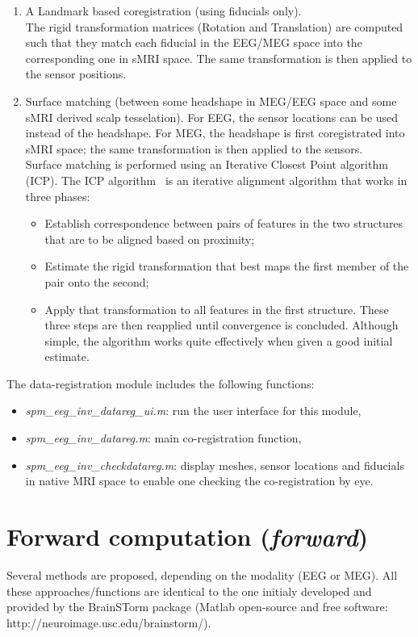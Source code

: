 \begin{enumerate}
	\item A Landmark based coregistration (using fiducials only).\\
	The rigid transformation matrices (Rotation and Translation) are computed such that they match each fiducial in the EEG/MEG space into the corresponding one in sMRI space. The same 					transformation is then applied to the sensor positions.
	\item Surface matching (between some headshape in MEG/EEG space and some sMRI derived scalp tesselation).
For EEG, the sensor locations can be used instead of the headshape. For MEG, the headshape is first coregistrated into sMRI space; the same transformation is then applied to the sensors.\\
Surface matching is performed using an Iterative Closest Point algorithm (ICP). The ICP algorithm~\cite{Besl_McKay} is an iterative alignment algorithm that works in three phases:
\begin{itemize}
	\item Establish correspondence between pairs of features in the two structures that are to be aligned based on proximity;
	\item Estimate the rigid transformation that best maps the first member of the pair onto the second;
	\item Apply that transformation to all features in the first structure. These three steps are then reapplied until convergence is concluded.
Although simple, the algorithm works quite effectively when given a good initial estimate.
\end{itemize}
\end{enumerate}

The data-registration module includes the following functions:
\begin{itemize}
	\item \textit{spm\_eeg\_inv\_datareg\_ui.m}: run the user interface for this module,
	\item \textit{spm\_eeg\_inv\_datareg.m}:	main co-registration function,
	\item \textit{spm\_eeg\_inv\_checkdatareg.m}: display meshes, sensor locations and fiducials in native MRI space to enable one checking the co-registration by eye.
\end{itemize}


\section{Forward computation (\textit{forward})}
Several methods are proposed, depending on the modality (EEG or MEG). All these approaches/functions are identical to the one initialy developed and provided by the BrainSTorm package (Matlab open-source and free software: http://neuroimage.usc.edu/brainstorm/).


